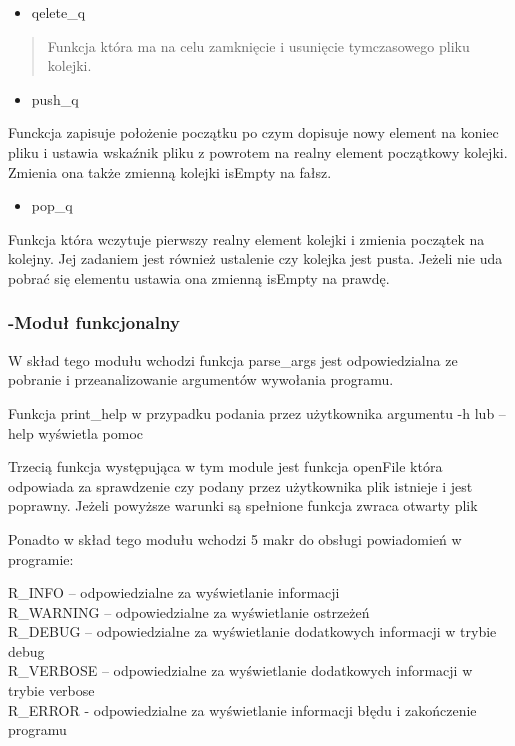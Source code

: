 \documentclass[
]{article}
\begin{document}
\begin{itemize}
\item
  qelete\_q
\end{itemize}

\begin{quote}
Funkcja która ma na celu zamknięcie i usunięcie tymczasowego pliku
kolejki.
\end{quote}

\begin{itemize}
\item
  push\_q
\end{itemize}

Funckcja zapisuje położenie początku po czym dopisuje nowy element na
koniec pliku i ustawia wskaźnik pliku z powrotem na realny element
początkowy kolejki. Zmienia ona także zmienną kolejki isEmpty na fałsz.

\begin{itemize}
\item
  pop\_q
\end{itemize}

Funkcja która wczytuje pierwszy realny element kolejki i zmienia
początek na kolejny. Jej zadaniem jest również ustalenie czy kolejka
jest pusta. Jeżeli nie uda pobrać się elementu ustawia ona zmienną
isEmpty na prawdę.

\hypertarget{moduux142-funkcjonalny}{%
\subsubsection{\texorpdfstring{-Moduł funkcjonalny
}{-Moduł funkcjonalny }}\label{moduux142-funkcjonalny}}

W skład tego modułu wchodzi funkcja parse\_args jest odpowiedzialna ze
pobranie i przeanalizowanie argumentów wywołania programu.

Funkcja print\_help w przypadku podania przez użytkownika argumentu -h
lub --help wyświetla pomoc

Trzecią funkcja występująca w tym module jest funkcja openFile która
odpowiada za sprawdzenie czy podany przez użytkownika plik istnieje i
jest poprawny. Jeżeli powyższe warunki są spełnione funkcja zwraca
otwarty plik

Ponadto w skład tego modułu wchodzi 5 makr do obsługi powiadomień w
programie:

R\_INFO -- odpowiedzialne za wyświetlanie informacji\\
R\_WARNING -- odpowiedzialne za wyświetlanie ostrzeżeń\\
R\_DEBUG -- odpowiedzialne za wyświetlanie dodatkowych informacji w
trybie debug\\
R\_VERBOSE -- odpowiedzialne za wyświetlanie dodatkowych informacji w
trybie verbose\\
R\_ERROR - odpowiedzialne za wyświetlanie informacji błędu i zakończenie
programu
\end{document}
